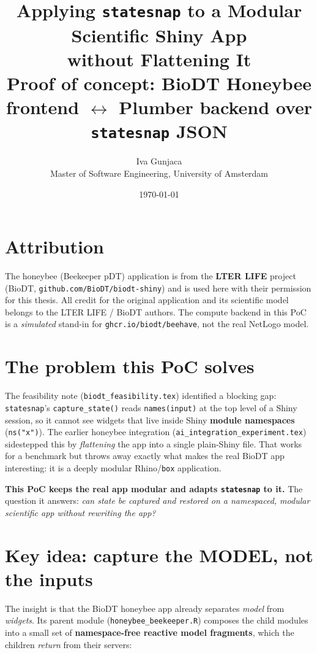\documentclass[12pt,a4paper]{article}
\title{\textbf{Applying \texttt{statesnap} to a Modular Scientific Shiny App\\
without Flattening It}\\[0.4em]
\large Proof of concept: BioDT Honeybee frontend $\leftrightarrow$ Plumber backend
over \texttt{statesnap} JSON}
\author{Iva Gunjaca \\ Master of Software Engineering, University of Amsterdam}
\date{\today}
\begin{document}
\maketitle

\section*{Attribution}
The honeybee (Beekeeper pDT) application is from the \textbf{LTER LIFE} project
(BioDT, \texttt{github.com/BioDT/biodt-shiny}) and is used here with their
permission for this thesis. All credit for the original application and its
scientific model belongs to the LTER LIFE / BioDT authors. The compute backend
in this PoC is a \emph{simulated} stand-in for \texttt{ghcr.io/biodt/beehave},
not the real NetLogo model.

\section{The problem this PoC solves}

The feasibility note (\texttt{biodt\_feasibility.tex}) identified a blocking gap:
\texttt{statesnap}'s \texttt{capture\_state()} reads \texttt{names(input)} at the
top level of a Shiny session, so it cannot see widgets that live inside Shiny
\textbf{module namespaces} (\texttt{ns("x")}). The earlier honeybee integration
(\texttt{ai\_integration\_experiment.tex}) sidestepped this by \emph{flattening}
the app into a single plain-Shiny file. That works for a benchmark but throws
away exactly what makes the real BioDT app interesting: it is a deeply modular
Rhino/\texttt{box} application.

\textbf{This PoC keeps the real app modular and adapts \texttt{statesnap} to it.}
The question it answers: \emph{can state be captured and restored on a
namespaced, modular scientific app without rewriting the app?}

\section{Key idea: capture the MODEL, not the inputs}

The insight is that the BioDT honeybee app already separates \emph{model} from
\emph{widgets}. Its parent module (\texttt{honeybee\_beekeeper.R}) composes the
child modules into a small set of \textbf{namespace-free reactive model
fragments}, which the children \emph{return} from their servers:
\end{document}
